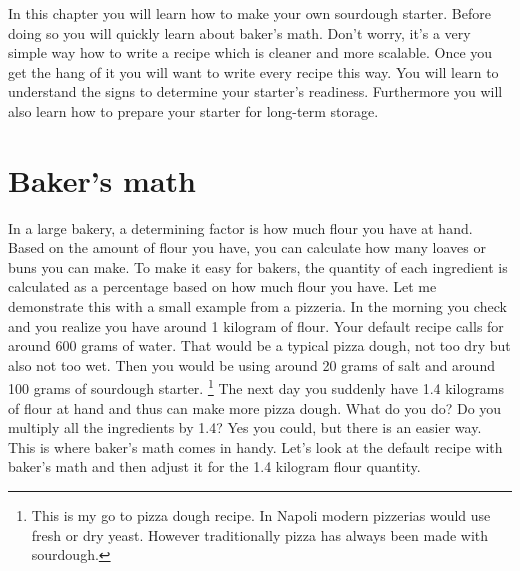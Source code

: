 In this chapter you will learn how to make your
own sourdough starter. Before doing so you will
quickly learn about baker's math. Don't worry,
it's a very simple way how to write a recipe which
is cleaner and more scalable.  Once you get the hang
of it you will want to write every recipe this way.
You will learn to understand the signs to determine
your starter's readiness.  Furthermore you will
also learn how to prepare your starter for long-term storage.

\section{Baker's math}
\label{section:bakers-math}

In a large bakery, a determining factor is how
much flour you have at hand. Based on the amount
of flour you have, you can calculate how many
loaves or buns you can make. To make it easy
for bakers, the quantity of each ingredient
is calculated as a percentage based on how much flour you have.
Let me demonstrate this with a small example from
a pizzeria.  In the morning you check and you realize you
have around 1 kilogram of flour.
Your default recipe calls for around 600 grams of water.
That would be a typical pizza dough, not too dry but
also not too wet. Then you would be using around 20 grams
of salt and around 100 grams of sourdough starter.
\footnote{This is my go to pizza dough recipe. In Napoli
modern pizzerias would use fresh or dry yeast. However
traditionally pizza has always been made with sourdough.}
The next day you suddenly have 1.4 kilograms of flour
at hand and thus can make more pizza dough. What do you do?
Do you multiply all the ingredients by 1.4? Yes you could,
but there is an easier way. This is where baker's math
comes in handy. Let's look at the default recipe with baker's
math and then adjust it for the 1.4 kilogram flour quantity.

\begin{table}[H]
\centering
{}
\end{table}

